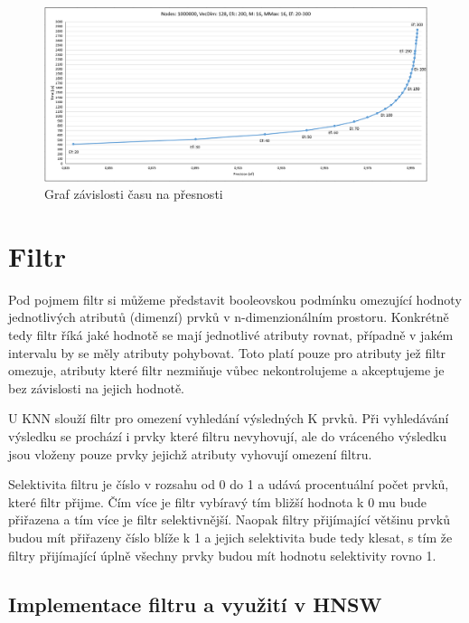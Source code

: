 \documentclass[czech,semestral,dept460,male,csharp,cpdeclaration]{diploma}
\begin{document}
		\begin{figure}
			\centering
			\includegraphics[scale=0.5]{Figures/graf_hnsw.png}
			\caption{Graf závislosti času na přesnosti}
			\label{graf_hnsw}
		\end{figure}
	
	\chapter{Filtr}
	
		Pod pojmem filtr si můžeme představit booleovskou podmínku omezující hodnoty jednotlivých atributů (dimenzí) prvků v n-dimenzionálním prostoru. Konkrétně tedy filtr říká jaké hodnotě se mají jednotlivé atributy rovnat, případně v jakém intervalu by se měly atributy pohybovat. Toto platí pouze pro atributy jež filtr omezuje, atributy které filtr nezmiňuje vůbec nekontrolujeme a akceptujeme je bez závislosti na jejich hodnotě.
		
		U KNN slouží filtr pro omezení vyhledání výsledných K prvků. Při vyhledávání výsledku se prochází i prvky které filtru nevyhovují, ale do vráceného výsledku jsou vloženy pouze prvky jejichž atributy vyhovují omezení filtru.
		
		Selektivita filtru \cite{OptINFORMIX} je číslo v rozsahu od 0 do 1 a udává procentuální počet prvků, které filtr přijme. Čím více je filtr vybíravý tím bližší hodnota k 0 mu bude přiřazena a tím více je filtr selektivnější. Naopak filtry přijímající většinu prvků budou mít přiřazeny číslo blíže k 1 a jejich selektivita bude tedy klesat, s tím že filtry přijímající úplně všechny prvky budou mít hodnotu selektivity rovno 1.
		
		\section{Implementace filtru a využití v HNSW}
		
\end{document}
